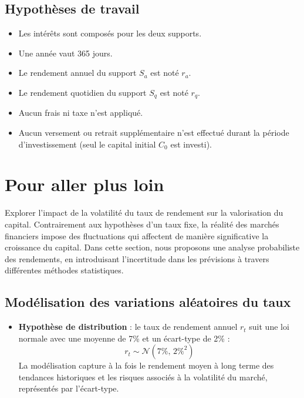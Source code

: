 \documentclass{article}
\begin{document}
\subsection{Hypothèses de travail}
\begin{itemize}
\item Les intérêts sont composés pour les deux supports.
\item Une année vaut 365 jours.
\item Le rendement annuel du support $S_a$ est noté $r_a$.
\item Le rendement quotidien du support $S_q$ est noté $r_q$.
\item Aucun frais ni taxe n'est appliqué.
\item Aucun versement ou retrait supplémentaire n’est effectué durant la période d'investissement (seul le capital initial $C_0$ est investi).
\end{itemize}

\section{Pour aller plus loin}

Explorer l'impact de la volatilité du taux de rendement sur la valorisation du capital. Contrairement aux hypothèses d’un taux fixe, la réalité des marchés financiers impose des fluctuations qui affectent de manière significative la croissance du capital. Dans cette section, nous proposons une analyse probabiliste des rendements, en introduisant l'incertitude dans les prévisions à travers différentes méthodes statistiques.

\subsection{Modélisation des variations aléatoires du taux}
\begin{itemize}
    \item \textbf{Hypothèse de distribution} :  
    le taux de rendement annuel \( r_t \) suit une loi normale avec une moyenne de 7\% et un écart-type de 2\% :  
    \[
    r_t \sim \mathcal{N}(7\%, \, 2\%^2)
    \]
    La modélisation capture à la fois le rendement moyen à long terme des tendances historiques et les risques associés à la volatilité du marché, représentés par l'écart-type.
\end{itemize}
\end{document}
